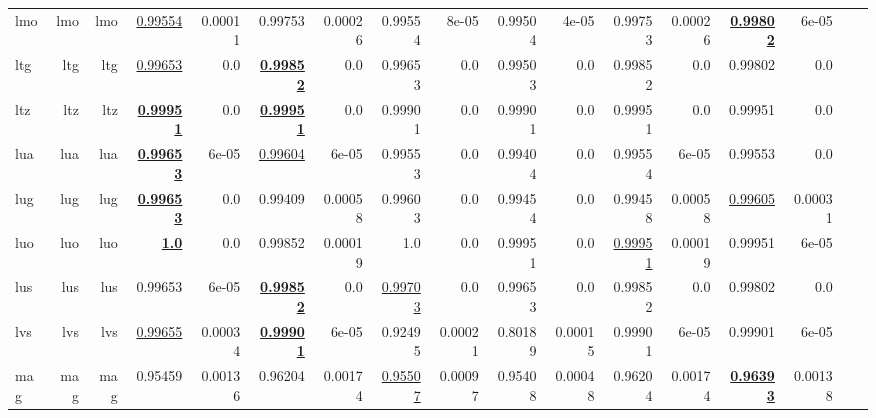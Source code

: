 \documentclass[11pt]{article}
\begin{document}
\begin{table*}[h]
{\begin{tabular}{lrrrrrrrrrrrrrrrr}
lmo         & lmo         & lmo         & \underline{0.99554}         & 0.00011         & 0.99753         & 0.00026         & 0.99554         & 8e-05         & 0.99504         & 4e-05         & 0.99753         & 0.00026         & \textbf{\underline{0.99802}}         & 6e-05         \\
ltg         & ltg         & ltg         & \underline{0.99653}         & 0.0         & \textbf{\underline{0.99852}}         & 0.0         & 0.99653         & 0.0         & 0.99503         & 0.0         & 0.99852         & 0.0         & 0.99802         & 0.0         \\
ltz         & ltz         & ltz         & \textbf{\underline{0.99951}}         & 0.0         & \textbf{\underline{0.99951}}         & 0.0         & 0.99901         & 0.0         & 0.99901         & 0.0         & 0.99951         & 0.0         & 0.99951         & 0.0         \\
lua         & lua         & lua         & \textbf{\underline{0.99653}}         & 6e-05         & \underline{0.99604}         & 6e-05         & 0.99553         & 0.0         & 0.99404         & 0.0         & 0.99554         & 6e-05         & 0.99553         & 0.0         \\
lug         & lug         & lug         & \textbf{\underline{0.99653}}         & 0.0         & 0.99409         & 0.00058         & 0.99603         & 0.0         & 0.99454         & 0.0         & 0.99458         & 0.00058         & \underline{0.99605}         & 0.00031         \\
luo         & luo         & luo         & \textbf{\underline{1.0}}         & 0.0         & 0.99852         & 0.00019         & 1.0         & 0.0         & 0.99951         & 0.0         & \underline{0.99951}         & 0.00019         & 0.99951         & 6e-05         \\
lus         & lus         & lus         & 0.99653         & 6e-05         & \textbf{\underline{0.99852}}         & 0.0         & \underline{0.99703}         & 0.0         & 0.99653         & 0.0         & 0.99852         & 0.0         & 0.99802         & 0.0         \\
lvs         & lvs         & lvs         & \underline{0.99655}         & 0.00034         & \textbf{\underline{0.99901}}         & 6e-05         & 0.92495         & 0.00021         & 0.80189         & 0.00015         & 0.99901         & 6e-05         & 0.99901         & 6e-05         \\
mag         & mag         & mag         & 0.95459         & 0.00136         & 0.96204         & 0.00174         & \underline{0.95507}         & 0.00097         & 0.95408         & 0.00048         & 0.96204         & 0.00174         & \textbf{\underline{0.96393}}         & 0.00138         \\

\end{tabular}}
\end{table*}
\end{document}

